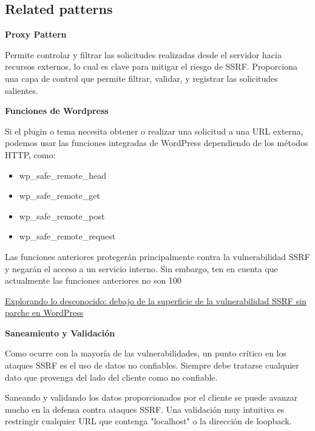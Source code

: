 \subsection*{Related patterns}

\textbf{Proxy Pattern} 

Permite controlar y filtrar las solicitudes realizadas desde el servidor hacia recursos externos, lo cual es clave para mitigar el riesgo de SSRF. Proporciona una capa de control que permite filtrar, validar, y registrar las solicitudes salientes.

\textbf{Funciones de Wordpress} 

Si el plugin o tema necesita obtener o realizar una solicitud a una URL externa, podemos usar las funciones integradas de WordPress dependiendo de los métodos HTTP, como: 

\begin{itemize}
    \item wp\_safe\_remote\_head
    \item wp\_safe\_remote\_get
    \item wp\_safe\_remote\_post
    \item wp\_safe\_remote\_request
\end{itemize}

Las funciones anteriores protegerán principalmente contra la vulnerabilidad SSRF y negarán el acceso a un servicio interno. Sin embargo, ten en cuenta que actualmente las funciones anteriores no son 100%

\href{https://patchstack.com/articles/exploring-the-unpatched-wordpress-ssrf/}{Explorando lo desconocido: debajo de la superficie de la vulnerabilidad SSRF sin parche en WordPress} 

\textbf{Saneamiento y Validación} 

Como ocurre con la mayoría de las vulnerabilidades, un punto crítico en los ataques SSRF es el uso de datos no confiables. Siempre debe tratarse cualquier dato que provenga del lado del cliente como no confiable.

Saneando y validando los datos proporcionados por el cliente se puede avanzar mucho en la defensa contra ataques SSRF. Una validación muy intuitiva es restringir cualquier URL que contenga "localhost" o la dirección de loopback.

